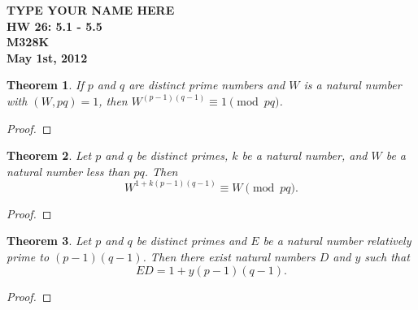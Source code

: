 \documentclass[12pt,leqno]{article}
\numberwithin{equation}{section}
\newtheorem{thm}{Theorem}[section]
\theoremstyle{definition}
\begin{document}
\thispagestyle{plain}
\begin{flushright}
\large{\textbf{TYPE YOUR NAME HERE \\
HW 26: 5.1 - 5.5\\
M328K \\
May 1st, 2012 \\}}
\end{flushright}

\markboth{}{} \setcounter{section}{0} \baselineskip=18pt

\setcounter{tocdepth}{4}



\setcounter{section}{5}

\setcounter{thm}{0}


\begin{thm}
If $p$ and $q$ are distinct prime numbers and $W$ is a natural
number with $(W, pq)=1$, then $W^{(p-1)(q-1)}\equiv 1 \pmod{pq}$.
\end{thm}
\begin{proof}[Proof]
\end{proof}


\begin{thm}
Let $p$ and $q$ be distinct primes, $k$ be a natural number, and $W$
be a natural number less than $pq$. Then
\[W^{1+k(p-1)(q-1)}\equiv W\pmod{pq}.\]
\end{thm}
\begin{proof}[Proof]
\end{proof}

\begin{thm}
Let $p$ and $q$ be distinct primes and $E$ be a natural number
relatively prime to $(p-1)(q-1)$. Then there exist natural numbers
$D$ and $y$ such that
\[ED = 1+y(p-1)(q-1).\]
\end{thm}
\begin{proof}[Proof]
\end{proof}
\end{document}
